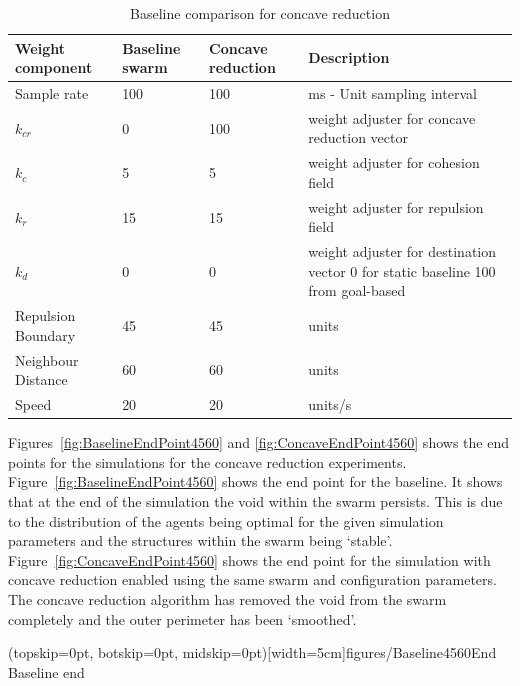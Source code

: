 \documentclass{ieeeaccess}
\begin{document}
\begin{table}
\caption{Baseline comparison for concave reduction} 
\label{tab:BaselineConcaveReduction3}
\begin{center}
\begin{tabular}{| p{1.4cm} | p{1.2cm} | p{1.2cm} | p{2.5cm} |}
\hline
\bf Weight \bf component & \bf Baseline \bf swarm & \bf Concave \bf reduction & \bf Description \\ \hline
Sample rate & 100 & 100 & ms - Unit sampling interval\\  \hline
$k_{cr}$ & 0 & 100 & weight adjuster for concave reduction vector\\  \hline
$k_c$ & 5 & 5 & weight adjuster for cohesion field\\  \hline
$k_r$ & 15 & 15 & weight adjuster for repulsion field\\  \hline
$k_d$ & 0 & 0 & weight adjuster for destination vector 0 for static baseline 100 from goal-based\\  \hline
Repulsion Boundary & 45 & 45 & units\\  \hline
Neighbour Distance & 60 & 60 & units\\  \hline
Speed & 20 & 20 & units/s\\  \hline
\end{tabular}
\end{center}
\end{table}

Figures~\ref{fig:BaselineEndPoint4560} and \ref{fig:ConcaveEndPoint4560} shows the end points for the simulations for the concave reduction experiments. Figure~\ref{fig:BaselineEndPoint4560} shows the end point for the baseline. It shows that at the end of the simulation the void within the swarm persists. This is due to the distribution of the agents being optimal for the given simulation parameters and the structures within the swarm being `stable'. Figure~\ref{fig:ConcaveEndPoint4560} shows the end point for the simulation with concave reduction enabled using the same swarm and configuration parameters. The concave reduction algorithm has removed the void from the swarm completely and the outer perimeter has been `smoothed'. 

\Figure[t!](topskip=0pt, botskip=0pt, midskip=0pt)[width=5cm]{figures/Baseline4560End}
{Baseline end\label{fig:BaselineEndPoint4560}}

\end{document}
